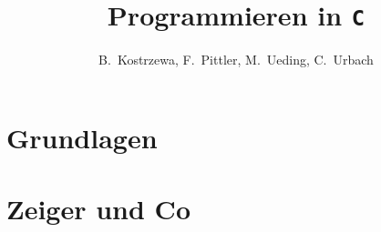 \documentclass[12pt]{scrbook}
\title{Programmieren in \texttt{C}}                     \let\Title\@title
\author{B.~Kostrzewa, F.~Pittler, M.~Ueding, C.~Urbach} \let\Author\@author
\begin{document}
\maketitle

\tableofcontents

\clearpage
\chapter{Grundlagen}







\chapter{Zeiger und Co}






%
%


\printindex
\end{document}

